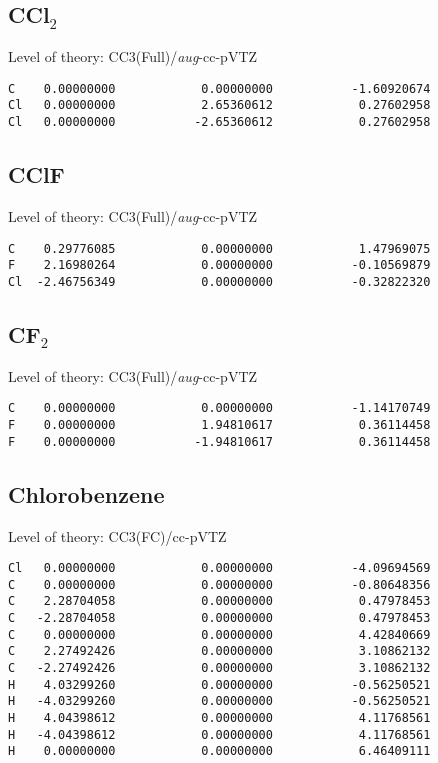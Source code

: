 \documentclass[journal=jctcce,manuscript=article,layout=traditional]{achemso}
\newcommand{\TZ}{cc-pVTZ}
\newcommand{\AVTZ}{\emph{aug}-cc-pVTZ}
\begin{document}
\subsection*{CCl$_2$}

\begin{singlespace}
Level of theory: CC3(Full)/{\AVTZ}
\begin{verbatim}
C    0.00000000            0.00000000           -1.60920674
Cl   0.00000000            2.65360612            0.27602958
Cl   0.00000000           -2.65360612            0.27602958
\end{verbatim}
\end{singlespace}

\subsection*{CClF}

\begin{singlespace}
Level of theory: CC3(Full)/{\AVTZ}
\begin{verbatim}
C    0.29776085            0.00000000            1.47969075
F    2.16980264            0.00000000           -0.10569879
Cl  -2.46756349            0.00000000           -0.32822320
\end{verbatim}
\end{singlespace}

\subsection*{CF$_2$}

\begin{singlespace}
Level of theory: CC3(Full)/{\AVTZ}
\begin{verbatim}
C    0.00000000            0.00000000           -1.14170749
F    0.00000000            1.94810617            0.36114458
F    0.00000000           -1.94810617            0.36114458
\end{verbatim}
\end{singlespace}

\subsection*{Chlorobenzene}

\begin{singlespace}
Level of theory: CC3(FC)/{\TZ}
\begin{verbatim}
Cl   0.00000000            0.00000000           -4.09694569
C    0.00000000            0.00000000           -0.80648356
C    2.28704058            0.00000000            0.47978453
C   -2.28704058            0.00000000            0.47978453
C    0.00000000            0.00000000            4.42840669
C    2.27492426            0.00000000            3.10862132
C   -2.27492426            0.00000000            3.10862132
H    4.03299260            0.00000000           -0.56250521
H   -4.03299260            0.00000000           -0.56250521
H    4.04398612            0.00000000            4.11768561
H   -4.04398612            0.00000000            4.11768561
H    0.00000000            0.00000000            6.46409111
\end{verbatim}
\end{singlespace}
\end{document}
